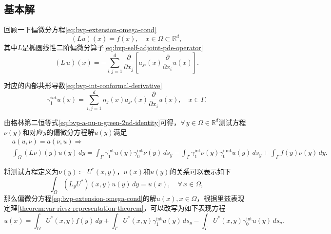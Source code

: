 \subsection{基本解}
\label{bvp-fund-solutions}

回顾一下偏微分方程\eqref{eq:bvp-extension-omega-cond}
\begin{equation*}
  \left( L u \right)(x) = f(x), \quad x \in \Omega \subset \mathbb{R}^d,
\end{equation*}
其中$L$是椭圆线性二阶偏微分算子\eqref{eq:bvp-self-adjoint-pde-operator}
\begin{equation*}
  \left( L \, u \right)(x) = - \sum_{i,j=1}^d \frac{\partial}{\partial x_j} \left[ a_{ji} (x) \frac{\partial}{\partial x_i} u(x)\right].
\end{equation*}

对应的内部共形导数\eqref{eq:bvp-int-conformal-derivative}
\begin{equation*}
  \gamma_1^{int}u(x) =
\sum_{i,j=1}^{d} n_j(x) a_{ji} \left( x \right) \frac{\partial}{\partial x_{i}} u \left( x \right)
  , \quad x \in \Gamma.
\end{equation*}

由格林第二恒等式\eqref{eq:bvp-a-nu-u-green-2nd-identity}可得，$\forall \, y \in \Omega \in \mathbb{R}^d$测试方程$\nu(y)$和对应$y$的偏微分方程解$u(y)$满足
\begin{equation*}
  \begin{split}
    &a(u,\nu) = a(\nu,u) \Rightarrow \\
    &\int_{\Omega} (L \nu)(y) u(y) \, dy =
    \int_{\Gamma} \gamma_{1}^{\text{int}} u(y) \gamma_{0}^{\text{int}} \nu(y) \, d s_y
    - \int_{\Gamma} \gamma_{1}^{\text{int}} \nu(y) \gamma_{0}^{\text{iunt}} u(y) \, d s_y
    + \int_{\Gamma} f(y) \nu(y) \, dy.
  \end{split}
\end{equation*}

将测试方程定义为$\nu(y) \coloneqq U^{*}(x,y)$，$u(x)$和$u(y)$的关系可以表示如下
\begin{equation*}
  \int_{\Omega} \left( L_{y} U^{*} \right) (x,y) u(y) \, dy = u(x), \quad \forall \, x \in \Omega,
\end{equation*}
那么偏微分方程\eqref{eq:bvp-extension-omega-cond}的解$u(x), x \in \Omega$，根据里兹表现定理\ref{theorem:var-riesz-representation-theorem}，可以改写为如下表现方程
\begin{equation}
  \label{eq:bvp-fund-var-ux-uy}
  u(x) = \int_{\Omega} U^{*}(x,y) f(y) \, dy
  + \int_{\Gamma} U^{*}(x,y) \gamma_{1}^{\text{int}} u(y) \, d s_y
  - \int_{\Gamma} U^{*}(x,y) \gamma_{0}^{\text{int}} u(y) \, d s_y.
\end{equation}

